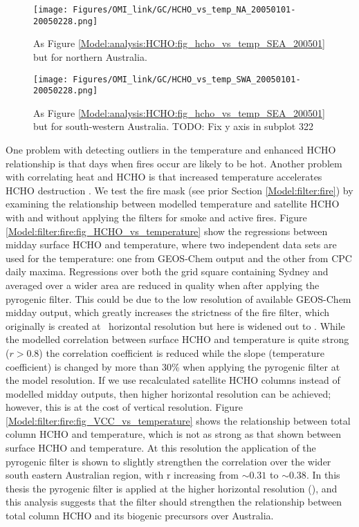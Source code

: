   \begin{figure}
    \texttt{[image: Figures/OMI\_link/GC/HCHO\_vs\_temp\_NA\_20050101-20050228.png]}
    \caption{%
      As Figure \ref{Model:analysis:HCHO:fig_hcho_vs_temp_SEA_200501} but for northern Australia.
    }
    \label{Model:analysis:HCHO:fig_hcho_vs_temp_NA_200501}
  \end{figure}
  
  \begin{figure}
    \texttt{[image: Figures/OMI\_link/GC/HCHO\_vs\_temp\_SWA\_20050101-20050228.png]}
    \caption{%
      As Figure \ref{Model:analysis:HCHO:fig_hcho_vs_temp_SEA_200501} but for south-western Australia.
      TODO: Fix y axis in subplot 322
    }
    \label{Model:analysis:HCHO:fig_hcho_vs_temp_SWA_200501}
  \end{figure}
  
  One problem with detecting outliers in the temperature and enhanced HCHO relationship is that days when fires occur are likely to be hot.
  Another problem with correlating heat and HCHO is that increased temperature accelerates HCHO destruction \parencite{Zheng2015}.
  We test the fire mask (see prior Section \ref{Model:filter:fire}) by examining the relationship between modelled temperature and satellite HCHO with and without applying the filters for smoke and active fires.
  Figure \ref{Model:filter:fire:fig_HCHO_vs_temperature} show the regressions between midday surface HCHO and temperature, where two independent data sets are used for the temperature: one from GEOS-Chem output and the other from CPC daily maxima.
  Regressions over both the grid square containing Sydney and averaged over a wider area are reduced in quality when after applying the pyrogenic filter. 
  This could be due to the low resolution of available GEOS-Chem midday output, which greatly increases the strictness of the fire filter, which originally is created at \highhr ~horizontal resolution but here is widened out to \lowhr.
  While the modelled correlation between surface HCHO and temperature is quite strong ($r>0.8$) the correlation coefficient is reduced while the slope (temperature coefficient) is changed by more than 30\% when applying the pyrogenic filter at the model resolution.
  If we use recalculated satellite HCHO columns instead of modelled midday outputs, then higher horizontal resolution can be achieved; however, this is at the cost of vertical resolution.
  Figure \ref{Model:filter:fire:fig_VCC_vs_temperature} shows the relationship between total column HCHO and temperature, which is not as strong as that shown between surface HCHO and temperature.
  At this resolution the application of the pyrogenic filter is shown to slightly strengthen the correlation over the wider south eastern Australian region, with r increasing from $\sim{0.31}$ to $\sim{0.38}$.
  In this thesis the pyrogenic filter is applied at the higher horizontal resolution (\highhr), and this analysis suggests that the filter should strengthen the relationship between total column HCHO and its biogenic precursors over Australia.
  
